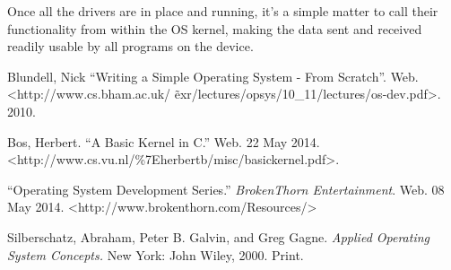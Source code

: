 \documentclass[english]{paper}
\begin{document}
Once all the drivers are in place and running, it's a simple matter to call their functionality from within the OS kernel, making the data sent and received readily usable by all programs on the device.

\newpage

\begin{thebibliography}{1}

 Blundell, Nick ``Writing a Simple Operating System - From Scratch''. Web. <http://www.cs.bham.ac.uk/ \~ exr/lectures/opsys/10\_11/lectures/os-dev.pdf>. 2010.

  Bos, Herbert. ``A Basic Kernel in C.'' Web. 22 May 2014. <http://www.cs.vu.nl/\%7Eherbertb/misc/basickernel.pdf>.

 ``Operating System Development Series.'' {\em BrokenThorn Entertainment}. Web. 08 May 2014. <http://www.brokenthorn.com/Resources/>

 Silberschatz, Abraham, Peter B. Galvin, and Greg Gagne. \textit{Applied Operating System Concepts.} New York: John Wiley, 2000. Print.

\end{thebibliography}
\end{document}
